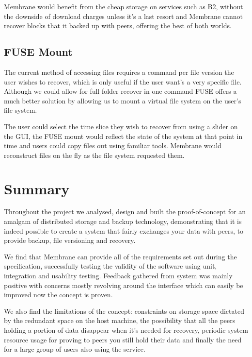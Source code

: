 \documentclass[11pt, a4paper, twoside]{report}
\begin{document}
Membrane would benefit from the cheap storage on services such as B2, without the downside of download charges unless it's a last resort and Membrane cannot recover blocks that it backed up with peers, offering the best of both worlds.

\subsection{FUSE Mount}

The current method of accessing files requires a command per file version the user wishes to recover, which is only useful if the user want's a very specific file. Although we could allow for full folder recover in one command FUSE offers a much better solution by allowing us to mount a virtual file system on the user's file system.

The user could select the time slice they wish to recover from using a slider on the GUI, the FUSE mount would reflect the state of the system at that point in time and users could copy files out using familiar tools. Membrane would reconstruct files on the fly as the file system requested them.

\section{Summary}

Throughout the project we analysed, design and built the proof-of-concept for an amalgam of distributed storage and backup technology, demonstrating that it is indeed possible to create a system that fairly exchanges your data with peers, to provide backup, file versioning and recovery.

We find that Membrane can provide all of the requirements set out during the specification, successfully testing the validity of the software using unit, integration and usability testing. Feedback gathered from system was mainly positive with concerns mostly revolving around the interface which can easily be improved now the concept is proven.

We also find the limitations of the concept: constraints on storage space dictated by the redundant space on the host machine, the possibility that all the peers holding a portion of data disappear when it's needed for recovery, periodic system resource usage for proving to peers you still hold their data and finally the need for a large group of users also using the service.


\onecolumn
\end{document}
